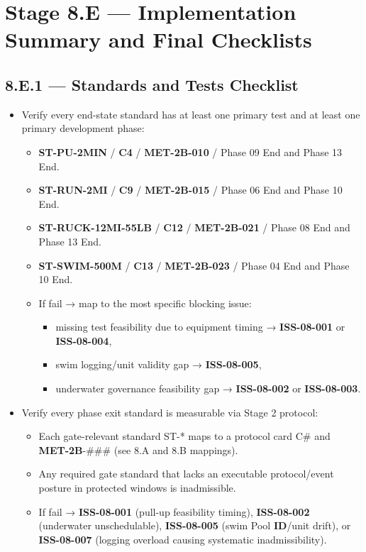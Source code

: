 \documentclass[10pt]{article}
\begin{document}
\section*{Stage 8.E — Implementation Summary and Final Checklists}
{}

\subsection*{8.E.1 — Standards and Tests Checklist}
{}

\begin{itemize}
\item Verify every end-state standard has at least one primary test and at least one primary development phase:
  \begin{itemize}
  \item \textbf{ST-PU-2MIN} / \textbf{C4} / \textbf{MET-2B-010} / Phase 09 End and Phase 13 End.
  \item \textbf{ST-RUN-2MI} / \textbf{C9} / \textbf{MET-2B-015} / Phase 06 End and Phase 10 End.
  \item \textbf{ST-RUCK-12MI-55LB} / \textbf{C12} / \textbf{MET-2B-021} / Phase 08 End and Phase 13 End.
  \item \textbf{ST-SWIM-500M} / \textbf{C13} / \textbf{MET-2B-023} / Phase 04 End and Phase 10 End.
  \item If fail → map to the most specific blocking issue:
    \begin{itemize}
    \item missing test feasibility due to equipment timing → \textbf{ISS-08-001} or \textbf{ISS-08-004},
    \item swim logging/unit validity gap → \textbf{ISS-08-005},
    \item underwater governance feasibility gap → \textbf{ISS-08-002} or \textbf{ISS-08-003}.
    \end{itemize}
  \end{itemize}

\item Verify every phase exit standard is measurable via Stage 2 protocol:
  \begin{itemize}
  \item Each gate-relevant standard ST-* maps to a protocol card C\# and \textbf{MET-2B}-\#\#\# (see 8.A and 8.B mappings).
  \item Any required gate standard that lacks an executable protocol/event posture in protected windows is inadmissible.
  \item If fail → \textbf{ISS-08-001} (pull-up feasibility timing), \textbf{ISS-08-002} (underwater unschedulable), \textbf{ISS-08-005} (swim Pool \textbf{ID}/unit drift), or \textbf{ISS-08-007} (logging overload causing systematic inadmissibility).
  \end{itemize}


\end{itemize}
\end{document}
